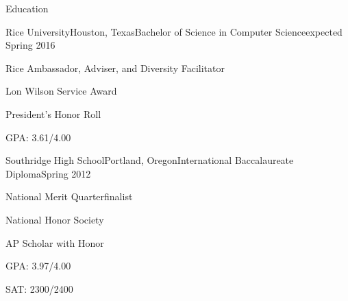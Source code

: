 \documentclass{resume}
\begin{document}
\begin{rSection}{Education}

\begin{rSubsection}{Rice University}{Houston, Texas}{Bachelor of Science in Computer Science}{expected Spring 2016}
\item Rice Ambassador, Adviser, and Diversity Facilitator
\item Lon Wilson Service Award
\item President's Honor Roll
\item GPA: 3.61/4.00
\end{rSubsection}

\begin{rSubsection}{Southridge High School}{Portland, Oregon}{International Baccalaureate Diploma}{Spring 2012}
\item National Merit Quarterfinalist
\item National Honor Society
\item AP Scholar with Honor
\item GPA: 3.97/4.00
\item SAT: 2300/2400
\end{rSubsection}


\end{rSection}
\end{document}
